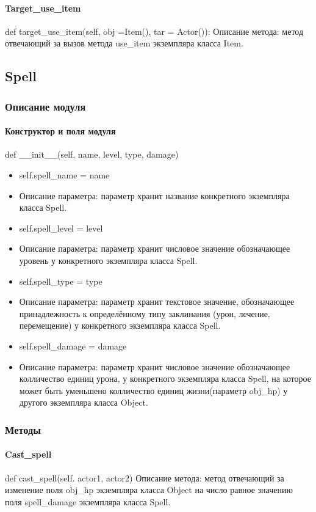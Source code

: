 \paragraph{Target\_use\_item}
def target\_use\_item(self, obj =Item(), tar = Actor()):
Описание метода: метод отвечающий за вызов метода use\_item экземпляра класса Item.	

\subsection{Spell}
\subsubsection{Описание модуля}
\paragraph{Конструктор и поля модуля}
def \_\_init\_\_(self, name, level, type, damage)
\begin{itemize}
	\item self.spell\_name = name
	\item Описание параметра: параметр хранит название конкретного экземпляра класса Spell.
	\item self.spell\_level = level
	\item Описание параметра: параметр хранит числовое значение обозначающее уровень у конкретного экземпляра класса Spell.
	\item self.spell\_type = type
	\item Описание параметра: параметр хранит текстовое значение, обозначающее принадлежность к определённому типу заклинания (урон, лечение, перемещение) у конкретного экземпляра класса Spell.
	\item self.spell\_damage = damage
	\item Описание параметра: параметр хранит числовое значение обозначающее колличество единиц урона, у конкретного экземпляра класса Spell, на которое может быть уменьшено колличество единиц жизни(параметр obj\_hp) у другого экземпляра класса Object.

\end{itemize}
\subsubsection{Методы}
\paragraph{Cast\_spell}
def cast\_spell(self. actor1, actor2)
Описание метода: метод отвечающий за изменение поля obj\_hp экземпляра класса Object на число равное значению поля spell\_damage экземпляра класса Spell.
